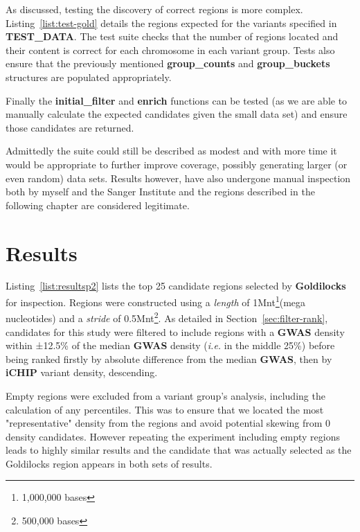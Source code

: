 As discussed, testing the discovery of correct regions is more complex.
Listing~\ref{list:test-gold} details the regions expected for the variants
specified in \textbf{TEST\_DATA}. The test suite checks that the number of
regions located and their content is correct for each chromosome in each variant
group. Tests also ensure that the previously mentioned \textbf{group\_counts}
and \textbf{group\_buckets} structures are populated appropriately.

Finally the \textbf{initial\_filter} and \textbf{enrich} functions can be tested
(as we are able to manually calculate the expected candidates given the small
data set) and ensure those candidates are returned.

Admittedly the suite could still be described as modest and with more time it
would be appropriate to further improve coverage, possibly generating larger (or
even random) data sets. Results however, have also undergone manual inspection
both by myself and the Sanger Institute and the regions described in
the following chapter are considered legitimate.


\chapter{Results}

Listing~\ref{list:resultsp2} lists the top 25 candidate regions selected by
\textbf{Goldilocks} for inspection. Regions were constructed using a
\textit{length} of 1Mnt\footnote{1,000,000 bases}(mega nucleotides) and a
\textit{stride} of 0.5Mnt\footnote{500,000 bases}. As detailed in
Section~\ref{sec:filter-rank}, candidates for this study were filtered to
include regions with a \textbf{GWAS} density within ±12.5\% of the
median \textbf{GWAS} density (\textit{i.e.} in the middle 25\%) before being
ranked firstly by absolute difference from the median \textbf{GWAS}, then by
\textbf{iCHIP} variant density, descending.

Empty regions were excluded from a variant group's analysis, including the
calculation of any percentiles. This was to ensure that we located the most
"representative" density from the regions and avoid potential skewing from 0 density
candidates. However repeating the experiment including empty regions
leads to highly similar results and the candidate that was actually selected as
the Goldilocks region appears in both sets of results.

